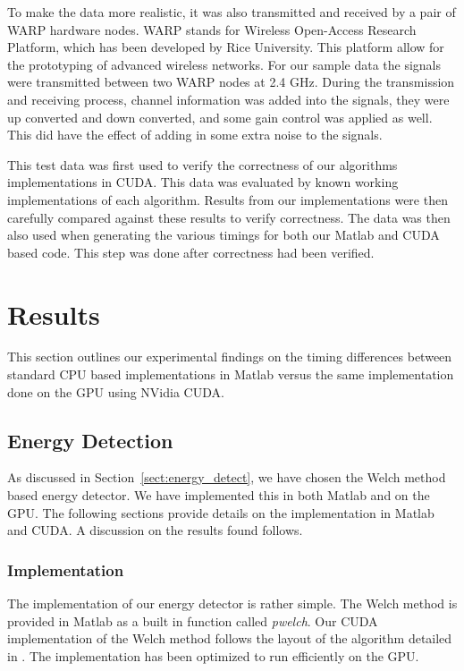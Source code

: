 To make the data more realistic, it was also transmitted and received by a pair of WARP hardware nodes.  WARP stands for Wireless Open-Access Research Platform, which has been developed by Rice University.  This platform allow for the prototyping of advanced wireless networks.  For our sample data the signals were transmitted between two WARP nodes at 2.4 GHz.  During the transmission and receiving process, channel information was added into the signals, they were up converted and down converted, and some gain control was applied as well.  This did have the effect of adding in some extra noise to the signals.

This test data was first used to verify the correctness of our algorithms implementations in CUDA.  This data was evaluated by known working implementations of each algorithm.  Results from our implementations were then carefully compared against these results to verify correctness.  The data was then also used when generating the various timings for both our Matlab and CUDA based code.  This step was done after correctness had been verified.

\section{Results}
\label{sect:gpu_results}
This section outlines our experimental findings on the timing differences between standard CPU based implementations in Matlab versus the same implementation done on the GPU using NVidia CUDA.

\subsection{Energy Detection}
\label{sect:energy_detect_result}
As discussed in Section~\ref{sect:energy_detect}, we have chosen the Welch method based energy detector.  We have implemented this in both Matlab and on the GPU.  The following sections provide details on the implementation in Matlab and CUDA.  A discussion on the results found follows.

\subsubsection{Implementation}
The implementation of our energy detector is rather simple.  The Welch method is provided in Matlab as a built in function called \textit{pwelch}.  Our CUDA implementation of the Welch method follows the layout of the algorithm detailed in \cite{Welch67}.  The implementation has been optimized to run efficiently on the GPU.
